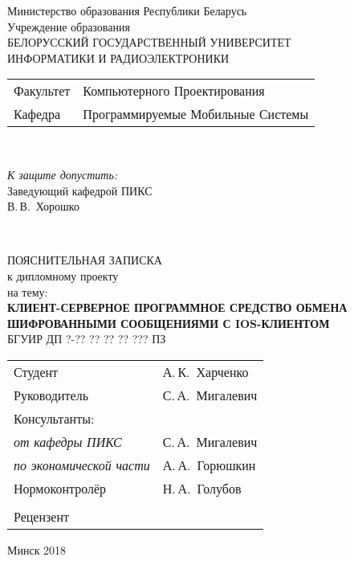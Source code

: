 \begin{titlepage}
  \begin{center}
    Министерство образования Республики Беларусь\\[1em]
    Учреждение образования\\
    БЕЛОРУССКИЙ ГОСУДАРСТВЕННЫЙ УНИВЕРСИТЕТ \\
    ИНФОРМАТИКИ И РАДИОЭЛЕКТРОНИКИ\\[1em]

    \begin{minipage}{\textwidth}
      \begin{flushleft}
        \begin{tabular}{ l l }
          Факультет & Компьютерного Проектирования\\
          Кафедра   & Программируемые Мобильные Системы
        \end{tabular}
      \end{flushleft}
    \end{minipage}\\[3em]

    \begin{flushright}
      \begin{minipage}{0.4\textwidth}
        \textit{К защите допустить:}\\[0.8em]
        Заведующий кафедрой ПИКС\\[0.45em]
        \underline{\hspace*{2.8cm}} В.\,В.~Хорошко
      \end{minipage}\\[2.2em]
    \end{flushright}

    {ПОЯСНИТЕЛЬНАЯ ЗАПИСКА}\\
    {к дипломному проекту}\\
    {на тему:}\\[1em]
    \textbf{\large\MakeUppercase{Клиент-серверное программное средство обмена шифрованными сообщениями с iOS-клиентом}}\\[1em]


    {БГУИР ДП ?-?? ?? ?? ?? ??? ПЗ}\\[2em]
    
    \begin{tabular}{ p{}p{} }
      Студент & А.\,К.~Харченко \\
      Руководитель & С.\,А.~Мигалевич \\
      Консультанты: &\\
      \hspace*{3ex}\emph{от кафедры ПИКС} & С.\,А.~Мигалевич \\
      \hspace*{3ex}\emph{по экономической части} & А.\,А.~Горюшкин \\
      Нормоконтролёр & Н.\,А.~Голубов\\
      & \\
      Рецензент &
    \end{tabular}
    
    \vfill
    {\normalsize Минск 2018}
  \end{center}
\end{titlepage}
